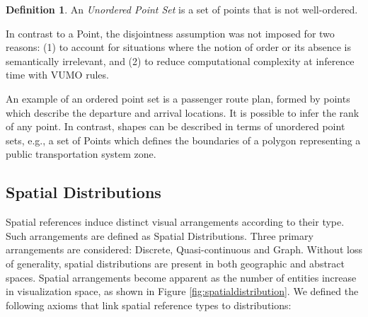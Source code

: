\documentclass[]{interact}
\theoremstyle{plain}%
\theoremstyle{definition}
\theoremstyle{remark}
\theoremstyle{definition}
\newtheorem{defn}{Definition}[section]
\begin{document}
\begin{defn}
	An \emph{Unordered Point Set} is a set of points that is not well-ordered.
\end{defn}


%

In contrast to a Point, the disjointness assumption was not imposed for two reasons: (1) to account for situations where the notion of order or its absence is semantically irrelevant, and (2) to reduce computational complexity at inference time with VUMO rules.


\noindent An example of an ordered point set is a passenger route plan, formed by points which describe the departure and arrival locations. It is possible to infer the rank of any point. In contrast, shapes can be described in terms of unordered point sets, e.g., a set of Points which defines the boundaries of a polygon representing a public transportation system zone.


\subsection{Spatial Distributions}
\label{sec:spatialdistributions}


Spatial references induce distinct visual arrangements according to their type. Such arrangements are defined as Spatial Distributions. Three primary arrangements are considered: Discrete, Quasi-continuous and Graph. Without loss of generality, spatial distributions are present in both geographic and abstract spaces. Spatial arrangements become apparent as the number of entities increase in visualization space, as shown in Figure \ref{fig:spatialdistribution}. We defined the following axioms that link spatial reference types to distributions:
\end{document}
